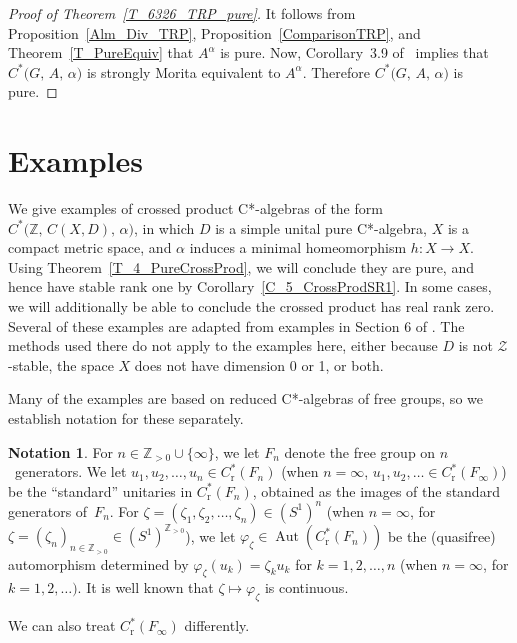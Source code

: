 \documentclass[10pt]{amsart}
\numberwithin{equation}{section}
\theoremstyle{definition}
\newtheorem{ntn}[thm]{Notation}
\newcommand{\af}{\alpha}
\newcommand{\zt}{\zeta}
\newcommand{\ph}{\varphi}
\newcommand{\Z}{{\mathbb{Z}}}
\newcommand{\N}{{\mathbb{Z}}_{> 0}}
\newcommand{\Aut}{{\operatorname{Aut}}}
\newcommand{\ct}{continuous}
\newcommand{\I}{\infty}
\newcommand{\JS}{\mathcal{Z}}
\begin{document}
\begin{proof}[Proof of Theorem~\ref{T_6326_TRP_pure}]
It follows from Proposition~\ref{Alm_Div_TRP},
Proposition~\ref{ComparisonTRP},
and Theorem~\ref{T_PureEquiv} that $A^{\alpha}$ is pure.
Now, Corollary~3.9 of~\cite{MohPhil2021TRP} implies that
$C^* \bigl( G, \, A, \, \af \bigr)$ is strongly
Morita equivalent to $A^{\alpha}$. Therefore
$C^* \bigl( G, \, A, \, \af \bigr)$ is pure.
\end{proof}

\section{Examples}\label{Sec_Examples}

We give examples of crossed product C*-algebras of the
form $C^* \bigl( \Z, \, C (X, D), \, \af \bigr)$, in which $D$
is a simple unital pure C*-algebra, $X$ is a compact metric
space, and $\af$ induces a minimal homeomorphism
$h \colon X \to X$.
Using Theorem~\ref{T_4_PureCrossProd},
we will conclude they are pure, and hence have stable rank
one by Corollary~\ref{C_5_CrossProdSR1}.
In some cases, we
will additionally be able to conclude the crossed product
has real rank zero.
Several of these examples are
adapted from examples in Section 6 of \cite{ArBcPh2}.
The methods used there do not apply to the examples here,
either because $D$ is not $\JS$-stable,
the space $X$ does not have dimension 0 or 1, or both.

Many of the examples are based on reduced C*-algebras of free
groups, so we establish notation for these separately.

\begin{ntn}\label{N_1_QFreeFn}
For $n \in \N \cup \{ \I \}$, we let $F_n$ denote the free
group on $n$~generators.
We let $u_1, u_2, \ldots, u_n \in C^*_{\mathrm{r}} (F_n)$
(when $n = \I$,
$u_1, u_2, \ldots \in C^*_{\mathrm{r}} (F_{\infty})$)
be the ``standard'' unitaries in $C^*_{\mathrm{r}} (F_n)$,
obtained as the images of the standard generators of~$F_n$.
For $\zt = (\zt_1, \zt_2, \ldots, \zt_n) \in (S^1)^n$
(when $n = \I$,
for $\zt = (\zt_n)_{n \in \N} \in (S^1)^{\N}$), we let
$\ph_{\zt} \in \Aut ( C^*_{\mathrm{r}} (F_n) )$ be the
(quasifree) automorphism determined by
$\ph_{\zt} (u_k) = \zt_k u_k$ for $k = 1, 2, \ldots, n$
(when $n = \I$, for $k = 1, 2, \ldots)$.
It is well known
that $\zt \mapsto \ph_{\zt}$ is \ct.
\end{ntn}

We can also treat $C^*_{\mathrm{r}} (F_{\infty})$ differently.
\end{document}
